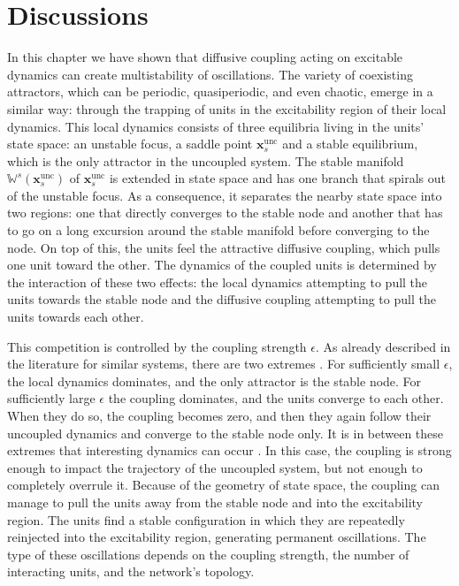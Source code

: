 \section{Discussions}\label{sec:discussions}
In this chapter we have shown that diffusive coupling acting on excitable dynamics can create multistability of oscillations. The variety of coexisting attractors, which can be periodic, quasiperiodic, and even chaotic, emerge in a similar way: through the trapping of units in the excitability region of their local dynamics. This local dynamics consists of three equilibria living in the units' state space: an unstable focus, a saddle point $\mathbf{x}_s^\mathrm{unc}$ and a stable equilibrium, which is the only attractor in the uncoupled system. The stable manifold $\mathbb{W}^s(\mathbf{x}_s^\mathrm{unc})$ of $\mathbf{x}_s^\mathrm{unc}$ is extended in state space and has one branch that spirals out of the unstable focus. As a consequence, it separates the nearby state space into two regions: one that directly converges to the stable node and another that has to go on a long excursion around the stable manifold before converging to the node. On top of this, the units feel the attractive diffusive coupling, which pulls one unit toward the other. The dynamics of the coupled units is determined by the interaction of these two effects: the local dynamics attempting to pull the units towards the stable node and the diffusive coupling attempting to pull the units towards each other.

This competition is controlled by the coupling strength $\epsilon$. As already described in the literature for similar systems, there are two extremes \cite{stankovski2017coupling}. For sufficiently small $\epsilon$, the local dynamics dominates, and the only attractor is the stable node. For sufficiently large $\epsilon$ the coupling dominates, and the units converge to each other. When they do so, the coupling becomes zero, and then they again follow their uncoupled dynamics and converge to the stable node only. It is in between these extremes that interesting dynamics can occur \cite{stankovski2017coupling}. In this case, the coupling is strong enough to impact the trajectory of the uncoupled system, but not enough to completely overrule it. Because of the geometry of state space, the coupling can manage to pull the units away from the stable node and into the excitability region. The units find a stable configuration in which they are repeatedly reinjected into the excitability region, generating permanent oscillations. The type of these oscillations depends on the coupling strength, the number of interacting units, and the network's topology.

